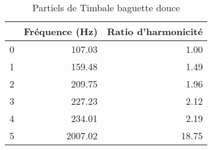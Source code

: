\begin{table}
\centering
\caption{Partiels de Timbale baguette douce}
\label{table:partiels-timbale-soft.wav}
\begin{tabular}{lrr}
\toprule
{} &  Fréquence (Hz) &  Ratio d'harmonicité \\
\midrule
0 &          107.03 &                 1.00 \\
1 &          159.48 &                 1.49 \\
2 &          209.75 &                 1.96 \\
3 &          227.23 &                 2.12 \\
4 &          234.01 &                 2.19 \\
5 &         2007.02 &                18.75 \\
\bottomrule
\end{tabular}
\end{table}
